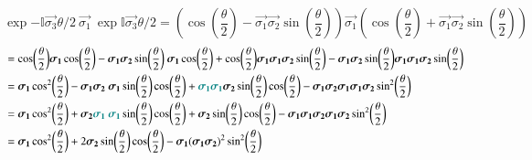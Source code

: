 $$ 	\exp{ -\mathbb{I} \vec{\sigma_3} \theta / 2} \ \vec{\sigma_1}  \
\exp{ \mathbb{I} \vec{\sigma_3} \theta / 2}  = \left(  \cos(\frac{\theta}{2}) - \vec{\sigma_1} \vec{\sigma_2} \sin(\frac{\theta}{2}) \right) \vec{\sigma_1} \left(  \cos(\frac{\theta}{2}) + \vec  {\sigma_1} \vec{\sigma_2} \sin(\frac{\theta}{2}) \right) $$
\begin{align*} 
                                                 &=   \cos(\frac{\theta}{2}) \vec{\sigma_1} \cos(\frac{\theta}{2}) 
                                                  - \vec{\sigma_1} \vec{\sigma_2} \sin(\frac{\theta}{2})  \ \vec{\sigma_1} \cos(\frac{\theta}{2})
                                                  + \cos(\frac{\theta}{2}) \vec{\sigma_1}  \vec{\sigma_1} \vec{\sigma_2} \sin(\frac{\theta}{2}) 
                                                  -  \vec  {\sigma_1} \vec{\sigma_2} \sin(\frac{\theta}{2}) \vec{\sigma_1}  \vec{\sigma_1} \vec{\sigma_2} \sin(\frac{\theta}{2}) \\
                                                 &=  \vec{\sigma_1}   \cos[2](\frac{\theta}{2}) 
                                                  - \vec{\sigma_1} \vec{\sigma_2}  \ \vec{\sigma_1} \sin(\frac{\theta}{2})  \cos(\frac{\theta}{2}) 
                                                  + \color{teal} \vec{\sigma_1}  \vec{\sigma_1}  \color{black} \vec{\sigma_2} \sin(\frac{\theta}{2})  \cos(\frac{\theta}{2})
                                                  -  \vec  {\sigma_1} \vec{\sigma_2} \vec{\sigma_1} \vec{\sigma_1} \vec{\sigma_2}    \sin[2](\frac{\theta}{2}) \\
                                                 &=  \vec{\sigma_1}   \cos[2](\frac{\theta}{2}) 
                                                  + \vec{\sigma_2} \color{teal} \vec{\sigma_1}  \ \vec{\sigma_1} \color{black} \sin(\frac{\theta}{2})  \cos(\frac{\theta}{2})
                                                  + \vec{\sigma_2} \sin(\frac{\theta}{2})  \cos(\frac{\theta}{2})
                                                  -  \vec  {\sigma_1} \vec{\sigma_1} \vec{\sigma_2} \vec{\sigma_1} \vec{\sigma_2}    \sin[2](\frac{\theta}{2}) \\
                                                 &=  \vec{\sigma_1}   \cos[2](\frac{\theta}{2}) 
                                                 + 2 \vec{\sigma_2} \sin(\frac{\theta}{2})  \cos(\frac{\theta}{2})
                                                 - \vec{\sigma_1}  (\vec  {\sigma_1} \vec{\sigma_2} )^2    \sin[2](\frac{\theta}{2})
\end{align*}

